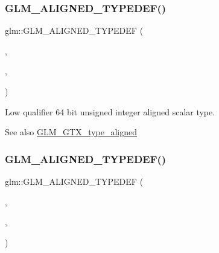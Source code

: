 \subsubsection{\texorpdfstring{G\+L\+M\+\_\+\+A\+L\+I\+G\+N\+E\+D\+\_\+\+T\+Y\+P\+E\+D\+E\+F()}{GLM\_ALIGNED\_TYPEDEF()}\hspace{0.1cm}{\footnotesize\ttfamily [72/209]}}
{\footnotesize\ttfamily glm\+::\+G\+L\+M\+\_\+\+A\+L\+I\+G\+N\+E\+D\+\_\+\+T\+Y\+P\+E\+D\+EF (\begin{DoxyParamCaption}\item[{\mbox{\hyperlink{group__gtc__type__precision_gacf666a9d9b309c4615c7a4f2ab0be289}{lowp\+\_\+uint64}}}]{,  }\item[{aligned\+\_\+lowp\+\_\+uint64}]{,  }\item[{8}]{ }\end{DoxyParamCaption})}

Low qualifier 64 bit unsigned integer aligned scalar type. \begin{DoxySeeAlso}{See also}
\mbox{\hyperlink{group__gtx__type__aligned}{G\+L\+M\+\_\+\+G\+T\+X\+\_\+type\+\_\+aligned}} 
\end{DoxySeeAlso}
\mbox{\label{group__gtx__type__aligned_ga0ba26b4e3fd9ecbc25358efd68d8a4ca}} 
\subsubsection{\texorpdfstring{G\+L\+M\+\_\+\+A\+L\+I\+G\+N\+E\+D\+\_\+\+T\+Y\+P\+E\+D\+E\+F()}{GLM\_ALIGNED\_TYPEDEF()}\hspace{0.1cm}{\footnotesize\ttfamily [73/209]}}
{\footnotesize\ttfamily glm\+::\+G\+L\+M\+\_\+\+A\+L\+I\+G\+N\+E\+D\+\_\+\+T\+Y\+P\+E\+D\+EF (\begin{DoxyParamCaption}\item[{\mbox{\hyperlink{group__gtc__type__precision_ga0910ef24195d1b8b26e34d73148c0c45}{lowp\+\_\+uint8\+\_\+t}}}]{,  }\item[{aligned\+\_\+lowp\+\_\+uint8\+\_\+t}]{,  }\item[{1}]{ }\end{DoxyParamCaption})}

